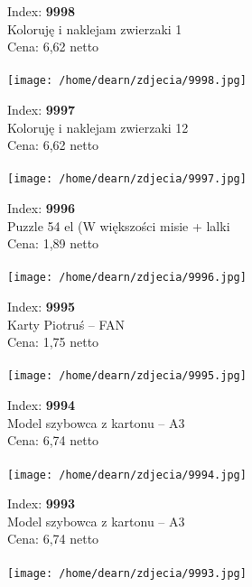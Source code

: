{Index: \textbf{9998}\\
Koloruję i naklejam zwierzaki 1 \\
Cena: 6,62 netto   \\\\  \texttt{[image: /home/dearn/zdjecia/9998.jpg]}}\newline\newline

{Index: \textbf{9997}\\
Koloruję i naklejam zwierzaki 12\\
Cena: 6,62 netto   \\\\  \texttt{[image: /home/dearn/zdjecia/9997.jpg]}}\newline\newline

{Index: \textbf{9996}\\
Puzzle 54 el (W większości misie + lalki\\
Cena: 1,89 netto   \\\\  \texttt{[image: /home/dearn/zdjecia/9996.jpg]}}\newline\newline

{Index: \textbf{9995}\\
Karty Piotruś – FAN\\
Cena: 1,75 netto   \\\\  \texttt{[image: /home/dearn/zdjecia/9995.jpg]}}\newline\newline

{Index: \textbf{9994}\\
Model szybowca z kartonu – A3\\
Cena: 6,74 netto   \\\\  \texttt{[image: /home/dearn/zdjecia/9994.jpg]}}\newline\newline

{Index: \textbf{9993}\\
Model szybowca z kartonu – A3\\
Cena: 6,74 netto   \\\\  \texttt{[image: /home/dearn/zdjecia/9993.jpg]}}\newline\newline

